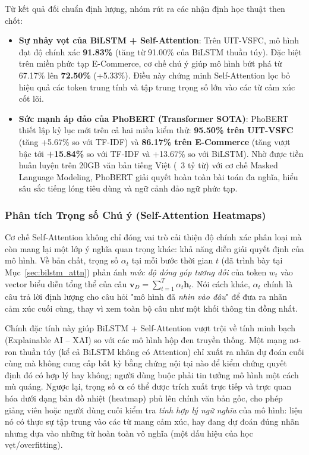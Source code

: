 \documentclass[12pt,a4paper]{article}
\begin{document}
Từ kết quả đối chuẩn định lượng, nhóm rút ra các nhận định học thuật then chốt:
\begin{itemize}[leftmargin=1.0cm, itemsep=2pt]
    \item[--] \textbf{Sự nhảy vọt của BiLSTM + Self-Attention}: Trên UIT-VSFC, mô hình đạt độ chính xác \textbf{91.83\%} (tăng từ 91.00\% của BiLSTM thuần túy). Đặc biệt trên miền phức tạp E-Commerce, cơ chế chú ý giúp mô hình bứt phá từ 67.17\% lên \textbf{72.50\%} (+5.33\%). Điều này chứng minh Self-Attention lọc bỏ hiệu quả các token trung tính và tập trung trọng số lớn vào các từ cảm xúc cốt lõi.
    \item[--] \textbf{Sức mạnh áp đảo của PhoBERT (Transformer SOTA)}: PhoBERT thiết lập kỷ lục mới trên cả hai miền kiểm thử: \textbf{95.50\% trên UIT-VSFC} (tăng +5.67\% so với TF-IDF) và \textbf{86.17\% trên E-Commerce} (tăng vượt bậc tới \textbf{+15.84\%} so với TF-IDF và +13.67\% so với BiLSTM). Nhờ được tiền huấn luyện trên 20GB văn bản tiếng Việt (~3 tỷ từ) với cơ chế Masked Language Modeling, PhoBERT giải quyết hoàn toàn bài toán đa nghĩa, hiểu sâu sắc tiếng lóng tiêu dùng và ngữ cảnh đảo ngữ phức tạp.
\end{itemize}

\subsubsection{Phân tích Trọng số Chú ý (Self-Attention Heatmaps)}\label{sec:attention_heatmaps_analysis}
Cơ chế Self-Attention không chỉ đóng vai trò cải thiện độ chính xác phân loại mà còn mang lại một lớp ý nghĩa quan trọng khác: khả năng diễn giải quyết định của mô hình. Về bản chất, trọng số $\alpha_t$ tại mỗi bước thời gian $t$ (đã trình bày tại Mục~\ref{sec:bilstm_attn}) phản ánh \textit{mức độ đóng góp tương đối} của token $w_t$ vào vector biểu diễn tổng thể của câu $\mathbf{v}_D = \sum_{t=1}^{T} \alpha_t \mathbf{h}_t$. Nói cách khác, $\alpha_t$ chính là câu trả lời định lượng cho câu hỏi "mô hình đã \textit{nhìn vào đâu}" để đưa ra nhãn cảm xúc cuối cùng, thay vì xem toàn bộ câu như một khối thông tin đồng nhất.

Chính đặc tính này giúp BiLSTM + Self-Attention vượt trội về tính minh bạch (Explainable AI -- XAI) so với các mô hình hộp đen truyền thống. Một mạng nơ-ron thuần túy (kể cả BiLSTM không có Attention) chỉ xuất ra nhãn dự đoán cuối cùng mà không cung cấp bất kỳ bằng chứng nội tại nào để kiểm chứng quyết định đó có hợp lý hay không; người dùng buộc phải tin tưởng mô hình một cách mù quáng. Ngược lại, trọng số $\boldsymbol{\alpha}$ có thể được trích xuất trực tiếp và trực quan hóa dưới dạng bản đồ nhiệt (heatmap) phủ lên chính văn bản gốc, cho phép giảng viên hoặc người dùng cuối kiểm tra \textit{tính hợp lý ngữ nghĩa} của mô hình: liệu nó có thực sự tập trung vào các từ mang cảm xúc, hay đang dự đoán đúng nhãn nhưng dựa vào những từ hoàn toàn vô nghĩa (một dấu hiệu của học vẹt/overfitting).
\end{document}
